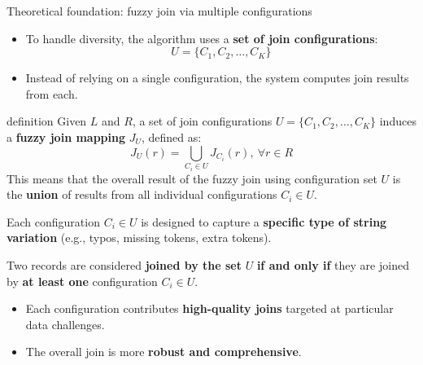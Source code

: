 \documentclass[8pt]{beamer} %
\begin{document}
\begin{frame}{Theoretical foundation: fuzzy join via multiple configurations}
	
	\begin{itemize}
		\item To handle diversity, the algorithm uses a \textbf{set of join configurations}:
		$$
		U = \{C_1, C_2, \dots, C_K\}
		$$
		\item Instead of relying on a single configuration, the system computes join results from each.
	\end{itemize}
	
	\vspace{1em}

	\begin{beamercolorbox}[rounded=true, shadow=true, leftskip=1em, rightskip=1em]{definition}
		Given $L$ and $R$, a set of join configurations $U = \{C_1, C_2, \ldots, C_K\}$ induces a \textbf{fuzzy join mapping} $J_U$, defined as:
		$$
		J_U(r) = \bigcup_{C_i \in U} J_{C_i}(r),\ \forall r \in R
		$$
		This means that the overall result of the fuzzy join using configuration set $U$ is the \textbf{union} of results from all individual configurations $C_i \in U$.
	\end{beamercolorbox}
	
	\vspace{0.5em}
	
	Each configuration $C_i \in U$ is designed to capture a \textbf{specific type of string variation} (e.g., typos, missing tokens, extra tokens).
	
	Two records are considered \textbf{joined by the set} $U$ \textbf{if and only if} they are joined by \textbf{at least one} configuration $C_i \in U$.
	
	\begin{itemize}
		\item Each configuration contributes \textbf{high-quality joins} targeted at particular data challenges.
		\item The overall join is more \textbf{robust and comprehensive}.
	\end{itemize}
\end{frame}
\end{document}
